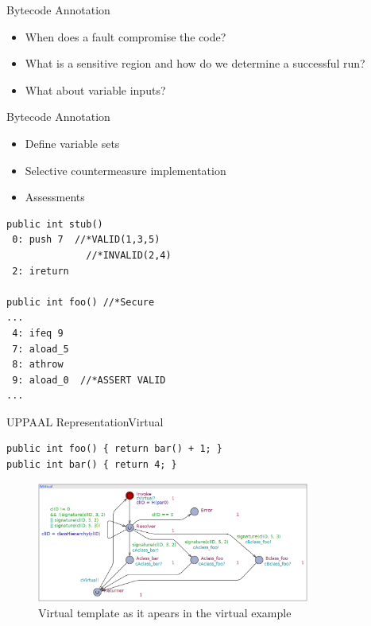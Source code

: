 

\begin{frame}{Bytecode Annotation}{}
\begin{itemize}
\item When does a fault compromise the code?
\item What is a sensitive region and how do we determine a successful run?
\item What about variable inputs? 
\end{itemize}
\end{frame}

\begin{frame}[fragile]{Bytecode Annotation}{}
\begin{minipage}{.35\textwidth}
\begin{itemize}
\item Define variable sets
\item Selective countermeasure implementation
\item Assessments
\end{itemize}

\end{minipage}%
\hspace{10px}
\begin{minipage}{0.60\textwidth}
\begin{lstlisting}[frame=single]
public int stub()
 0: push 7  //*VALID(1,3,5)
 	          //*INVALID(2,4)
 2: ireturn 

public int foo() //*Secure
...
 4: ifeq 9
 7: aload_5 
 8: athrow
 9: aload_0  //*ASSERT VALID
...
\end{lstlisting}
\end{minipage}
\end{frame}

\begin{frame}[fragile]{UPPAAL Representation}{Virtual}


\begin{lstlisting}[frame=single]
public int foo() { return bar() + 1; }
public int bar() { return 4; }
\end{lstlisting}

\begin{figure}
\centering
\includegraphics[width=0.8\textwidth]{figures/oldvirtual.png}
\caption{\footnotesize Virtual template as it apears in the virtual example}
\end{figure}
\end{frame}

